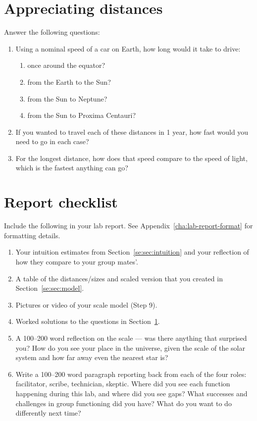 \section{Appreciating distances}\label{se:sec:calc}

Answer the following questions:
\begin{enumerate}
	\item Using a nominal speed of a car on Earth, how long would it take to drive:
	\begin{enumerate}
		\item once around the equator?
		\item from the Earth to the Sun?
		\item from the Sun to Neptune?
		\item from the Sun to Proxima Centauri?
	\end{enumerate}
	\item If you wanted to travel each of these distances in 1 year, how fast would you need to go in each case?
	\item For the longest distance, how does that speed compare to the speed of light, which is the fastest anything can go?
\end{enumerate}

\section{Report checklist}

Include the following in your lab report. See Appendix~\ref{cha:lab-report-format} for formatting details.

\begin{enumerate}
	\item Your intuition estimates from Section~\ref{se:sec:intuition} and your reflection of how they compare to your group mates'.
	\item A table of the distances/sizes and scaled version that you created in Section~\ref{se:sec:model}.
	\item Pictures or video of your scale model (Step 9).
	\item Worked solutions to the questions in Section~\ref{se:sec:calc}.
	\item A 100--200 word reflection on the scale --- was there anything that surprised you? How do you see your place in the universe, given the scale of the solar system and how far away even the nearest star is?
	\item Write a 100--200 word paragraph reporting back from each of the four roles: facilitator, scribe, technician, skeptic. Where did you see each function happening during this lab, and where did you see gaps? What successes and challenges in group functioning did you have? What do you want to do differently next time?
\end{enumerate}
